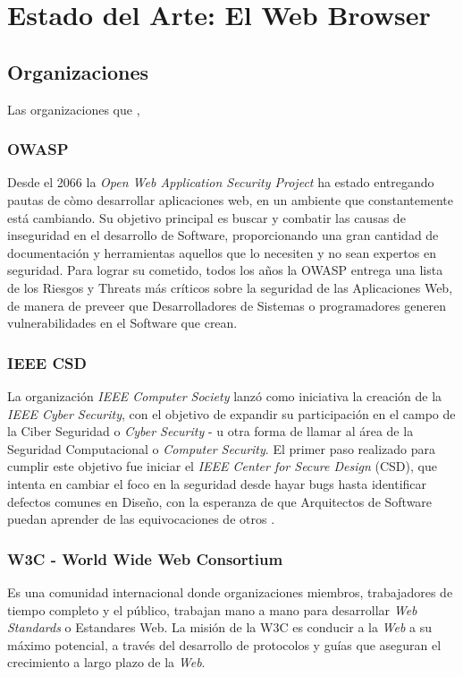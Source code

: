 \chapter{Estado del Arte: El Web Browser}
\label{chap:chap2}



\section{Organizaciones}
\label{chap:Orgs}
Las organizaciones que ,

\subsection{OWASP}
Desde el 2066 la \textit{Open Web Application Security Project} ha estado entregando pautas de còmo desarrollar aplicaciones web, en un ambiente que constantemente está cambiando. Su objetivo principal es buscar y combatir las causas de inseguridad en el desarrollo de Software, proporcionando una gran cantidad de documentación y herramientas aquellos que lo necesiten y no sean expertos en seguridad. Para lograr su cometido, todos los años la OWASP entrega una lista de los Riesgos y Threats más críticos sobre la seguridad de las Aplicaciones Web, de manera de preveer que Desarrolladores de Sistemas o programadores generen vulnerabilidades en el Software que crean.


\subsection{IEEE CSD}
La organización \textit{IEEE Computer Society} lanzó como iniciativa la creación de la \textit{IEEE Cyber Security}, con el objetivo de expandir su participación en el campo de la Ciber Seguridad o \textit{Cyber Security} - u otra forma de llamar al área de la Seguridad Computacional o \textit{Computer Security}. El primer paso realizado para cumplir este objetivo fue iniciar el \textit{IEEE Center for Secure Design} (CSD), que intenta en cambiar el foco en la seguridad desde hayar bugs hasta identificar defectos comunes en Diseño, con la esperanza de que Arquitectos de Software puedan aprender de las equivocaciones de otros \cite{ieeecsd1}.



\subsection{W3C - World Wide Web Consortium}
Es una comunidad internacional donde organizaciones miembros, trabajadores de tiempo completo y el público, trabajan mano a mano para desarrollar \textit{Web Standards} o Estandares Web. La misión de la W3C es conducir a la \textit{Web} a su máximo potencial, a través del desarrollo de protocolos y guías que aseguran el crecimiento a largo plazo de la \textit{Web}.




